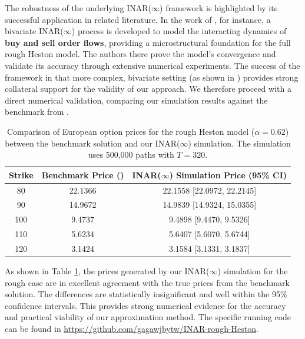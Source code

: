 \documentclass[letterpaper]{article}
\numberwithin{equation}{section}
\theoremstyle{definition}
\theoremstyle{remark}
\begin{document}
The robustness of the underlying INAR($\infty$) framework is highlighted by its successful application in related literature. In the work of \cite{wang2025rough}, for instance, a bivariate INAR($\infty$) process is developed to model the interacting dynamics of \textbf{buy and sell order flows}, providing a microstructural foundation for the full rough Heston model. The authors there prove the model's convergence and validate its accuracy through extensive numerical experiments. The success of the framework in that more complex, bivariate setting (as shown in \cite{wang2025rough}) provides strong collateral support for the validity of our approach. We therefore proceed with a direct numerical validation, comparing our simulation results against the benchmark from \cite{callegaro2021fast}.

\begin{table}[h]
\centering
\caption{Comparison of European option prices for the rough Heston model ($\alpha=0.62$) between the benchmark solution and our INAR($\infty$) simulation. The simulation uses 500,000 paths with {$T=320$}.}
\label{tab:goodnessoffit}
\begin{tabular}{ccc}
\hline
\textbf{Strike} & \textbf{Benchmark Price (\cite{callegaro2021fast})} & \textbf{INAR($\infty$) Simulation Price (95\% CI)} \\
\hline
80  & 22.1366 & 22.1558 [22.0972, 22.2145] \\
90  & 14.9672 & 14.9839 [14.9324, 15.0355] \\
100 & 9.4737  & 9.4898 [9.4470, 9.5326] \\
110 & 5.6234  & 5.6407 [5.6070, 5.6744] \\
120 & 3.1424  & 3.1584 [3.1331, 3.1837] \\
\hline
\end{tabular}
\end{table}

As shown in Table \ref{tab:goodnessoffit}, the prices generated by our INAR($\infty$) simulation for the rough case are in excellent agreement with the true prices from the benchmark solution. The differences are statistically insignificant and well within the 95\% confidence intervals. This provides strong numerical evidence for the accuracy and practical viability of our approximation method. The specific running code can be found in \url{https://github.com/gagawjbytw/INAR-rough-Heston}. 
\end{document}
